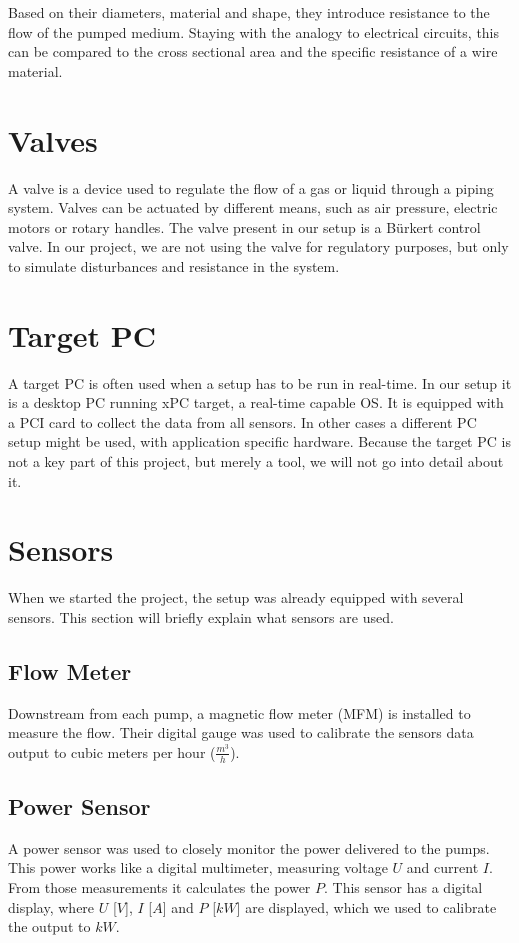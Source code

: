 Based on their diameters, material and shape,
they introduce resistance to the flow of the pumped medium.
Staying with the analogy to electrical circuits,
this can be compared to the cross sectional area and the specific resistance of a wire material.

\section{Valves}
A valve is a device used to regulate the flow of a gas or liquid through a piping system.
Valves can be actuated by different means, such as air pressure, electric motors or rotary handles.
The valve present in our setup is a Bürkert control valve.
In our project, we are not using the valve for regulatory purposes,
but only to simulate disturbances and resistance in the system.


\section{Target PC}
A target PC is often used when a setup has to be run in real-time.
In our setup it is a desktop PC running xPC target,
a real-time capable OS.
It is equipped with a PCI card to collect the data from all sensors. \cite{TargetPCSource}
In other cases a different PC setup might be used,
with application specific hardware.
Because the target PC is not a key part of this project,
but merely a tool,
we will not go into detail about it.

\section{Sensors}
When we started the project,
the setup was already equipped with several sensors.
This section will briefly explain what sensors are used.

\subsection*{Flow Meter}
Downstream from  each pump, a magnetic flow meter (MFM) is installed to measure the flow.\cite{MFM}
Their digital gauge was used to calibrate the sensors data output to cubic meters per hour ($\frac{m^3}{h}$).

\subsection*{Power Sensor}
A power sensor was used to closely monitor the power delivered to the pumps.
This power works like a digital multimeter,
measuring voltage $U$ and current $I$.
From those measurements it calculates the power $P$.\cite{LMG}
This sensor has a digital display, where $U$ [$V$], $I$ [$A$] and $P$ [$kW$] are displayed,
which we used to calibrate the output to $kW$.

